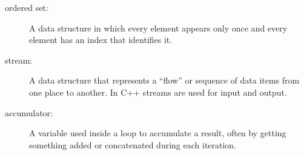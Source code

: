 \begin{description}

\item[ordered set:]  A data structure in which every element appears
only once and every element has an index that identifies it.

\item[stream:]  A data structure that represents a ``flow'' or
sequence of data items from one place to another.  In C++ streams
are used for input and output.

\item[accumulator:]  A variable used inside a loop to accumulate
a result, often by getting something added or concatenated during each
iteration.


\end{description}


